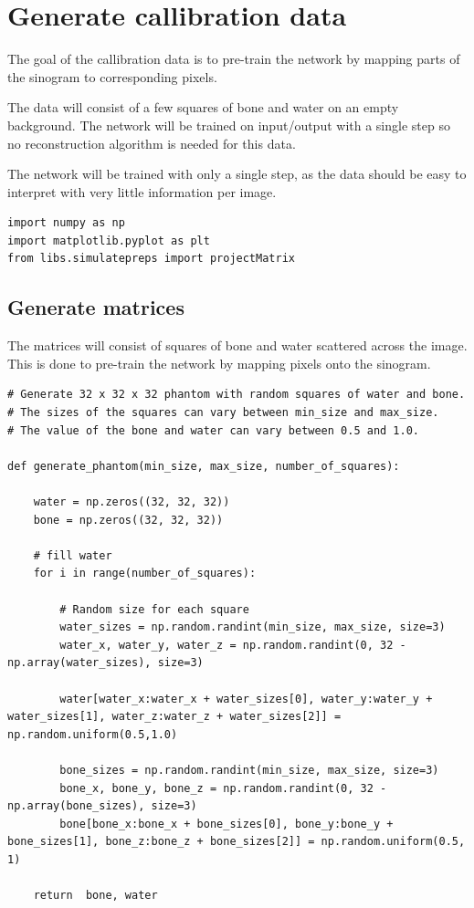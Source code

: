\section{Generate callibration data}

The goal of the callibration data is to pre-train the network by mapping parts of the sinogram to corresponding pixels.

The data will consist of a few squares of bone and water on an empty background. The network will be trained on input/output with a single step so no reconstruction algorithm is needed for this data.

The network will be trained with only a single step, as the data should be easy to interpret with very little information per image.

\begin{verbatim}
import numpy as np
import matplotlib.pyplot as plt
from libs.simulatepreps import projectMatrix
\end{verbatim}

\subsection{Generate matrices}

The matrices will consist of squares of bone and water scattered across the image. This is done to pre-train the network by mapping pixels onto the sinogram.

\begin{verbatim}
# Generate 32 x 32 x 32 phantom with random squares of water and bone.
# The sizes of the squares can vary between min_size and max_size.
# The value of the bone and water can vary between 0.5 and 1.0.

def generate_phantom(min_size, max_size, number_of_squares):

    water = np.zeros((32, 32, 32))
    bone = np.zeros((32, 32, 32))

    # fill water
    for i in range(number_of_squares):
        
        # Random size for each square
        water_sizes = np.random.randint(min_size, max_size, size=3)
        water_x, water_y, water_z = np.random.randint(0, 32 - np.array(water_sizes), size=3)

        water[water_x:water_x + water_sizes[0], water_y:water_y + water_sizes[1], water_z:water_z + water_sizes[2]] = np.random.uniform(0.5,1.0)
        
        bone_sizes = np.random.randint(min_size, max_size, size=3)
        bone_x, bone_y, bone_z = np.random.randint(0, 32 - np.array(bone_sizes), size=3)
        bone[bone_x:bone_x + bone_sizes[0], bone_y:bone_y + bone_sizes[1], bone_z:bone_z + bone_sizes[2]] = np.random.uniform(0.5, 1)

    return  bone, water
\end{verbatim}

